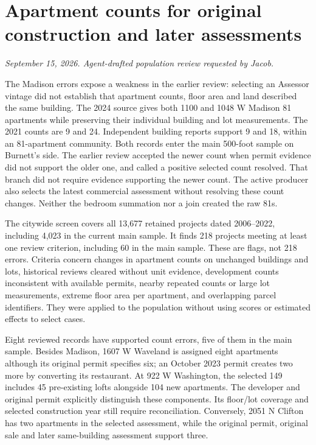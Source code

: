 \clearpage
\section*{Apartment counts for original construction and later assessments}
\textit{September 15, 2026. Agent-drafted population review requested by Jacob.}

The Madison errors expose a weakness in the earlier review: selecting an
Assessor vintage did not establish that apartment counts, floor area and
land described the same building. The 2024 source gives both 1100 and
1048 W Madison 81 apartments while preserving their individual building
and lot measurements. The 2021 counts are 9 and 24. Independent building
reports support 9 and 18, within an 81-apartment community. Both records
enter the main 500-foot sample on Burnett's side. The earlier review
accepted the newer count when permit evidence did not support the older
one, and called a positive selected count resolved. That branch did not
require evidence supporting the newer count. The active producer also
selects the latest commercial assessment without resolving these count
changes. Neither the bedroom summation nor a join created the raw 81s.

The citywide screen covers all 13,677 retained projects dated 2006--2022,
including 4,023 in the current main sample. It finds 218 projects meeting
at least one review criterion, including 60 in the main sample. These
are flags, not 218 errors. Criteria concern changes in apartment counts
on unchanged buildings and lots, historical reviews cleared without unit
evidence, development counts inconsistent with available permits,
nearby repeated counts or large lot measurements, extreme floor area per
apartment, and overlapping parcel identifiers. They were applied to the
population without using scores or estimated effects to select cases.

Eight reviewed records have supported count errors, five of them in the
main sample. Besides Madison, 1607 W Waveland is assigned eight apartments
although its original permit specifies six; an October 2023 permit
creates two more by converting its restaurant. At 922 W Washington,
the selected 149 includes 45 pre-existing lofts alongside 104 new
apartments. The developer and original permit explicitly distinguish
these components. Its floor/lot coverage and selected construction year
still require reconciliation. Conversely, 2051 N Clifton has two
apartments in the selected assessment, while the original permit,
original sale and later same-building assessment support three.

